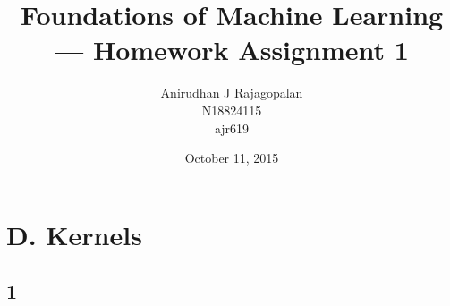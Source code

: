 \documentclass{article}
\begin{document}
\title{Foundations of Machine Learning --- Homework Assignment 1}
\date{October 11, 2015}
\author{Anirudhan J Rajagopalan\\ N18824115\\ ajr619}

\maketitle

\newpage

\section*{D. Kernels}
\subsection*{1}
\end{document}
